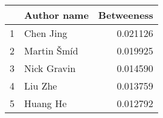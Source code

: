 \begin{tabular}{llr}
\toprule
{} &  Author name &  Betweeness \\
\midrule
1 &   Chen  Jing &    0.021126 \\
2 &  Martin Šmíd &    0.019925 \\
3 &  Nick Gravin &    0.014590 \\
4 &     Liu  Zhe &    0.013759 \\
5 &    Huang  He &    0.012792 \\
\bottomrule
\end{tabular}

